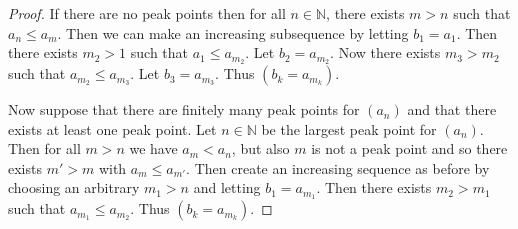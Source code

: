 \documentclass{article}
\begin{document}
\begin{flushleft}
\begin{proof}
If there are no peak points then for all $n \in \mathbb{N}$, there exists $m>n$ such that $a_n \leq a_m$. Then we can make an increasing subsequence by letting $b_1 = a_1$. Then there exists $m_2 > 1$ such that $a_1 \leq a_{m_2}$. Let $b_2 = a_{m_2}$. Now there exists $m_3 > m_2$ such that $a_{m_2} \leq a_{m_3}$. Let $b_3 = a_{m_3}$. Thus $(b_k = a_{m_k})$.\newline

Now suppose that there are finitely many peak points for $(a_n)$ and that there exists at least one peak point. Let $n \in \mathbb{N}$ be the largest peak point for $(a_n)$. Then for all $m>n$ we have $a_m < a_n$, but also $m$ is not a peak point and so there exists $m' > m$ with $a_m \leq a_{m'}$. Then create an increasing sequence as before by choosing an arbitrary $m_1>n$ and letting $b_1 = a_{m_1}$. Then there exists $m_2 > m_1$ such that $a_{m_1} \leq a_{m_2}$. Thus $(b_k = a_{m_k})$.
\end{proof}

\end{flushleft}
\end{document}

